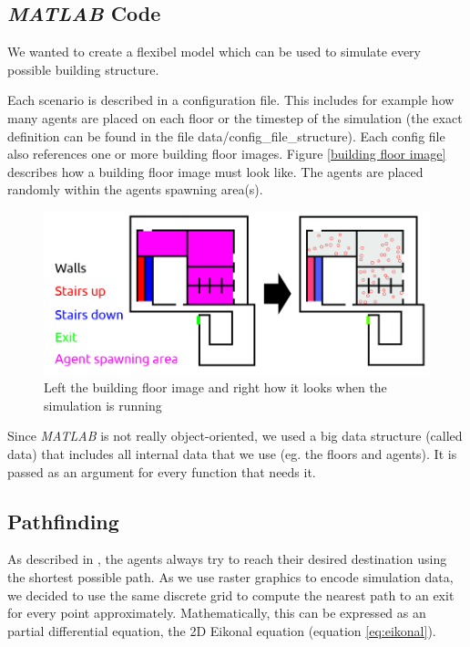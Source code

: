 \documentclass[11pt]{article}
\begin{document}
\subsection{\textit{MATLAB} Code} \label{matlab code}
We wanted to create a flexibel model which can be used to simulate every
possible building structure.


Each scenario is described in a configuration file. This includes for example how many
agents are placed on each floor or the timestep of the simulation (the exact
definition can be found in the file data/config\_file\_structure). Each config
file also references one or more building floor images.
Figure \vref{building floor image} describes how a building floor
image must look like. The agents are placed randomly within the agents spawning
area(s).

\begin{figure}[h]
\centering
\includegraphics[width=\textwidth]{./images/config_floor_description.png}
\caption{Left the building floor image and right how it looks when the
simulation is running} 
\label{building floor image}
\end{figure}

Since \textit{MATLAB} is not really object-oriented, we used a big data structure (called
data) that includes all internal data that we use (eg. the floors and agents).
It is passed as an argument for every function that needs it.

\subsection{Pathfinding}
As described in \cite{SFMPD}, the agents always try to reach their desired destination
using the shortest possible path. As we use raster graphics to encode simulation data,
we decided to use the same discrete grid to compute the nearest path to an exit for every point approximately.
Mathematically, this can be expressed as an partial differential equation, the 2D Eikonal equation (equation \ref{eq:eikonal}).
\end{document}
